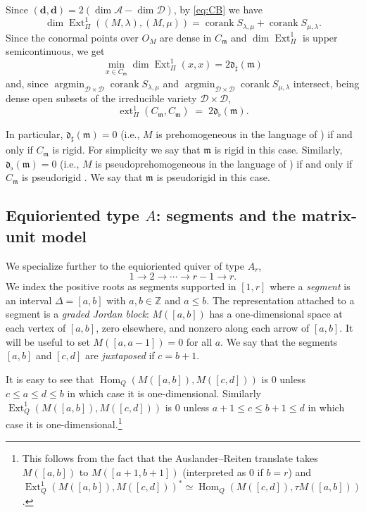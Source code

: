 \documentclass[12pt]{article}
\def\xspace{ }%
\theoremstyle{definition}
\newcommand{\prig}{pseudorigid\xspace}
\newcommand{\prigity}{pseudorigidity\xspace}
\newcommand{\pvs}{prehomogeneous\xspace}
\newcommand{\wpvs}{pseudo\pvs}
\newcommand{\argmin}{\operatorname{argmin}}
\newcommand{\ZZ}{\mathbb{Z}}
\newcommand{\bd}{\boldsymbol{d}}  %
\newcommand{\Ext}{\operatorname{Ext}}
\newcommand{\ext}{\operatorname{ext}}
\newcommand{\Hom}{\operatorname{Hom}}
\newcommand{\cmp}{C}                       %
\newcommand{\mm}{\mathfrak{m}}
\newcommand{\alg}{\mathcal{A}}   %
\newcommand{\bmdl}{\mathcal{D}}   %
\newcommand{\dfr}{\mathfrak{d}}  %
\newcommand{\Sop}{S}
\newcommand{\rsub}{\sharp}       %
\newcommand{\psub}{\flat}        %
\newcommand{\cork}{\operatorname{corank}}
\begin{document}
Since $(\bd,\bd) = 2(\dim\alg - \dim\bmdl)$, by \eqref{eq:CB} we have
\[
   \dim\Ext^1_\Pi((M,\lambda),(M,\mu))   = \cork \Sop_{\lambda,\mu} + \cork \Sop_{\mu,\lambda}.
\]
Since the conormal points over $O_M$ are dense in $\cmp_\mm$ and
$\dim\Ext^1_\Pi$ is upper semicontinuous, we get
\[
\min_{x\in \cmp_\mm}\dim\Ext^1_\Pi(x,x)=2\dfr_\rsub(\mm)
\]
and, since $\argmin_{\bmdl\times\bmdl}\cork \Sop_{\lambda,\mu}$ and $\argmin_{\bmdl\times\bmdl}\cork \Sop_{\mu,\lambda}$
intersect, being dense open subsets of the irreducible variety $\bmdl\times\bmdl$,
\begin{equation}\label{eq:extformula}
   \ext^1_\Pi(\cmp_\mm, \cmp_\mm) \;=\; 2\dfr_\psub(\mm).
\end{equation}

In particular, $\dfr_\rsub(\mm)=0$ (i.e., $M$ is \pvs in the language of ) if and only if $\cmp_\mm$ is rigid.
For simplicity we say that $\mm$ is rigid in this case.
Similarly, $\dfr_\psub(\mm)=0$ (i.e., $M$ is \wpvs in the language of ) if and only if $\cmp_\mm$ is \prig.
We say that $\mm$ is \prig in this case.


\subsection{Equioriented type \texorpdfstring{$A$}{A}: segments and the matrix-unit model}\label{ssec:typeA}

We specialize further to the equioriented quiver of type $A_r$,
\[
   1 \longrightarrow 2 \longrightarrow \cdots \longrightarrow r-1\longrightarrow r.
\]
We index the positive roots as segments supported in $[1,r]$ where
a \emph{segment} is an interval $\Delta = [a,b]$ with $a,b \in \ZZ$ and $a \le b$.
The representation attached to a segment is a \emph{graded Jordan block}:
$M([a,b])$ has a one-dimensional space at each vertex of $[a,b]$, zero
elsewhere, and nonzero along each arrow of $[a,b]$. It will be useful to set $M([a,a-1])=0$ for all $a$. We say that the segments $[a,b]$ and $[c,d]$ are \emph{juxtaposed} if $c=b+1$.

It is easy to see that $\Hom_Q(M([a,b]),M([c,d]))$ is $0$ unless $c \le a \le d \le b$ in which case it is one-dimensional.
Similarly $\Ext^1_Q(M([a,b]),M([c,d]))$ is $0$ unless $a+1\le c\le b+1\le d$ in which case it is one-dimensional.\footnote{This follows from
the fact that the Auslander--Reiten translate takes $M([a,b])$ to $M([a+1,b+1])$ (interpreted as $0$ if $b=r$) and $\Ext^1_Q(M([a,b]),M([c,d]))^* \simeq\Hom_Q(M([c,d]),\tau M([a,b]))$.}
\end{document}
